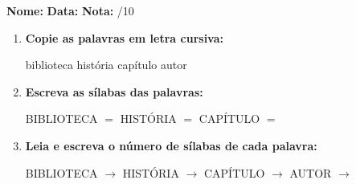 \begin{exercicio}



\noindent\textbf{Nome:} \underline{\hspace{3.2cm}} \quad \textbf{Data:} \underline{\hspace{1.6cm}} \quad \textbf{Nota:} \underline{\hspace{0.9cm}}/10


\begin{enumerate}

  \item \textbf{Copie as palavras em letra cursiva:}
  \begin{center}
  biblioteca \quad história \quad capítulo \quad autor
  \end{center}
  \begin{center}
  \underline{\hspace{2.4cm}} \quad \underline{\hspace{2.4cm}} \quad \underline{\hspace{2.4cm}} \quad \underline{\hspace{2.4cm}}
  \end{center}

  \item \textbf{Escreva as sílabas das palavras:}
  \begin{center}
  BIBLIOTECA $=$ \underline{\hspace{1.5cm}} \underline{\hspace{1.5cm}} \quad HISTÓRIA $=$ \underline{\hspace{1.5cm}} \underline{\hspace{1.5cm}} \quad CAPÍTULO $=$ \underline{\hspace{1.5cm}} \underline{\hspace{1.5cm}}
  \end{center}

  \item \textbf{Leia e escreva o número de sílabas de cada palavra:}
  \begin{center}
  BIBLIOTECA $\rightarrow$ \underline{\hspace{0.9cm}} \quad HISTÓRIA $\rightarrow$ \underline{\hspace{0.9cm}} \quad CAPÍTULO $\rightarrow$ \underline{\hspace{0.9cm}} \quad AUTOR $\rightarrow$ \underline{\hspace{0.9cm}}
  \end{center}


\end{enumerate}
\end{exercicio}
